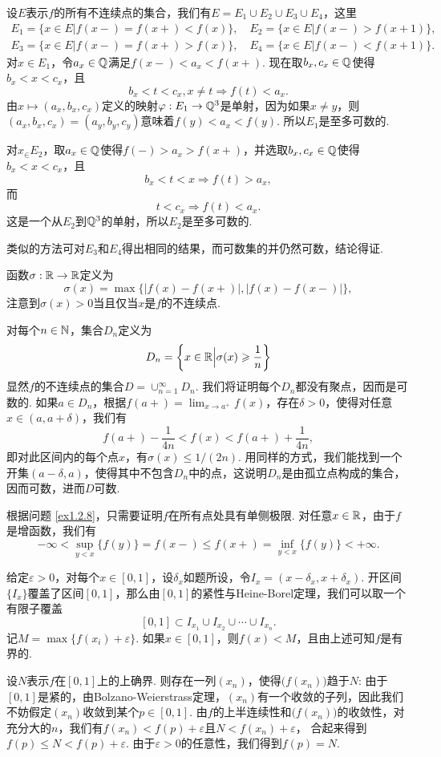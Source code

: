 \begin{ans}
  \method 设$E$表示$f$的所有不连续点的集合，我们有$E=E_1\cup E_2\cup E_3\cup E_4$，这里
  \begin{gather*}
    E_1= \{x\in E|f(x-)=f(x+)<f(x)\},\quad
    E_2= \{x\in E|f(x-)>f(x+1) \},\\
    E_3= \{x\in E|f(x-)=f(x+)>f(x)\},\quad
    E_4= \{x\in E|f(x-)<f(x+1) \}.
  \end{gather*}
  对$x\in E_1$，令$a_x\in\mathbb Q$满足$f(x-)<a_x<f(x+)$. 现在取$b_x,c_x\in\mathbb Q$使得$b_x<x<c_x$，且
  \[ b_x<t<c_x,x\ne t\Rightarrow f(t)<a_x. \]
  由$x\mapsto (a_x,b_x,c_x)$定义的映射$\varphi:E_1\to\mathbb Q^3$是单射，因为如果$x\ne y$，则$(a_x,b_x,c_x)=(a_y,b_y,c_y)$意味着$f(y)<a_x<f(y)$. 所以$E_1$是至多可数的.

  对$x_\in E_2$，取$a_x\in\mathbb Q$使得$f(-)>a_x>f(x+)$，并选取$b_x,c_x\in\mathbb Q$使得$b_x<x<c_x$，且
  \[ b_x<t<x\Rightarrow f(t)>a_x, \]
  而
  \[ t<c_x\Rightarrow f(t)<a_x. \]
  这是一个从$E_2$到$\mathbb Q^3$的单射，所以$E_2$是至多可数的.

  类似的方法可对$E_3$和$E_4$得出相同的结果，而可数集的并仍然可数，结论得证.

  \method 函数$\sigma:\mathbb R\to\mathbb R$定义为
  \[ \sigma(x)=\max\{|f(x)-f(x+)|,|f(x)-f(x-)|\},\]
  注意到$\sigma(x)>0$当且仅当$x$是$f$的不连续点.

  对每个$n\in\mathbb N$，集合$D_n$定义为
  \[ D_n=\bigg\{x\in\mathbb R\Big|\sigma(x)\geqslant\frac1n  \bigg\} \]
  显然$f$的不连续点的集合$D=\cup_{n=1}^\infty D_n$. 我们将证明每个$D_n$都没有聚点，因而是可数的. 如果$a\in D_n$，根据$f(a+)=\lim_{x\to a^+}f(x)$，存在$\delta>0$，使得对任意$x\in(a,a+\delta)$，我们有
  \[ f(a+)-\frac1{4n} < f(x) < f(a+)+\frac1{4n}, \]
  即对此区间内的每个点$x$，有$\sigma(x)\le1/(2n)$. 用同样的方式，我们能找到一个开集$(a-\delta,a)$，使得其中不包含$D_n$中的点，这说明$D_n$是由孤立点构成的集合，因而可数，进而$D$可数.
\end{ans}

\begin{ans}
  根据问题 \ref{ex1.2.8}，只需要证明$f$在所有点处具有单侧极限. 对任意$x\in\mathbb R$，由于$f$是增函数，我们有
  \[ -\infty<\sup_{y<x}\{f(y)\}=f(x-)\le f(x+)
  =\inf_{y<x}\{f(y)\}<+\infty. \]
\end{ans}

\begin{ans}
  给定$\varepsilon>0$，对每个$x\in[0,1]$，设$\delta_x$如题所设，令$I_x=(x-\delta_x,x+\delta_x)$. 开区间$\{I_x\}$覆盖了区间$[0,1]$，那么由$[0,1]$的紧性与Heine-Borel定理，我们可以取一个有限子覆盖
  \[ [0,1]\subset I_{x_1}\cup I_{x_2}\cup\cdots\cup I_{x_n}. \]
  记$M=\max\{f(x_i)+\varepsilon\}$. 如果$x\in[0,1]$，则$f(x)<M$，且由上述可知$f$是有界的.

  设$N$表示$f$在$[0,1]$上的上确界. 则存在一列$(x_n)$，使得$\big(f(x_n)\big)$趋于$N$: 由于$[0,1]$是紧的，由Bolzano-Weierstrass定理，$(x_n)$有一个收敛的子列，因此我们不妨假定$(x_n)$收敛到某个$p\in[0,1]$. 由$f$的上半连续性和$\big(f(x_n)\big)$的收敛性，对充分大的$n$，我们有$f(x_n)<f(p)+\varepsilon$且$N<f(x_n)+\varepsilon$， 合起来得到$f(p)\le N<f(p)+\varepsilon$. 由于$\varepsilon>0$的任意性，我们得到$f(p)=N$.
\end{ans}

